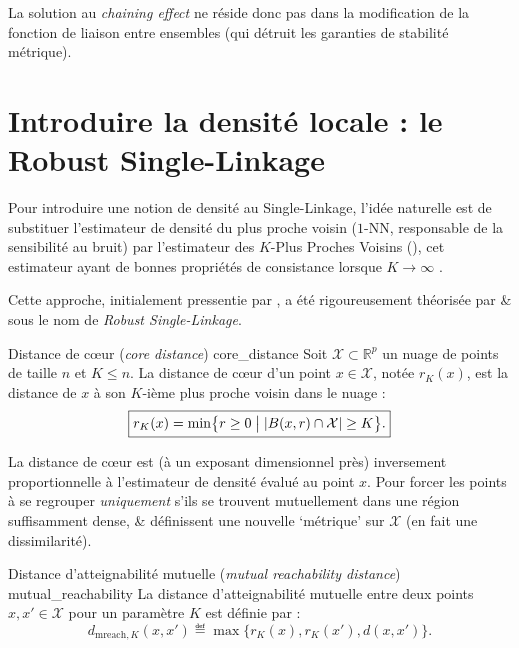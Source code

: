 La solution au \emph{chaining effect} ne réside donc pas dans la modification de la fonction de liaison entre ensembles (qui détruit les garanties de stabilité métrique). %


\section{Introduire la densité locale : le Robust Single-Linkage}
\label{sec:robust_single_linkage}

Pour introduire une notion de densité au Single-Linkage, l'idée naturelle est de substituer l'estimateur de densité du plus proche voisin ($1$-NN, responsable de la sensibilité au bruit) par l'estimateur des $K$-Plus Proches Voisins (\KNN), cet estimateur ayant de bonnes propriétés de consistance lorsque $K \to \infty$ \cite{BiauDevroye}. 

Cette approche, initialement pressentie par  \cite{RobustSingleLinkage1969}, a été rigoureusement théorisée par  \&  \cite{RobustSingleLinkage2010} sous le nom de \emph{Robust Single-Linkage}.

\begin{Definition}{Distance de cœur (\emph{core distance}) \cite{OPTICS1999}}{core_distance}
Soit $\mathcal{X} \subset \mathbb R^p$ un nuage de points de taille $n$ et $K \le n$. La distance de cœur d'un point $x \in \mathcal{X}$, notée $r_K(x)$, est la distance de $x$ à son $K$-ième plus proche voisin dans le nuage :
\[
\boxed{
    r_K(x) = \min \bigl\{ r \ge 0 \bigm| \lvert B(x, r) \cap \mathcal{X} \rvert \ge K \bigr\}.
    }
\]
\end{Definition}

La distance de cœur est (à un exposant dimensionnel près) inversement proportionnelle à l'estimateur de densité \KNN évalué au point $x$. Pour forcer les points à se regrouper \emph{uniquement} s'ils se trouvent mutuellement dans une région suffisamment dense,  \&  \cite{RobustSingleLinkage2010} définissent une nouvelle `métrique' sur $\mathcal{X}$ (en fait une dissimilarité).

\begin{Definition}{Distance d'atteignabilité mutuelle (\emph{mutual reachability distance}) \cite{RobustSingleLinkage2010}}{mutual_reachability}
La distance d'atteignabilité mutuelle entre deux points $x, x' \in \mathcal{X}$ pour un paramètre $K$ est définie par :
\[
\boxed{
    d_{\mathrm{mreach}, K}(x, x') \eqdef \max \bigl\{ r_K(x), r_K(x'), d(x, x') \bigr\}.
    }
\]
\end{Definition}


